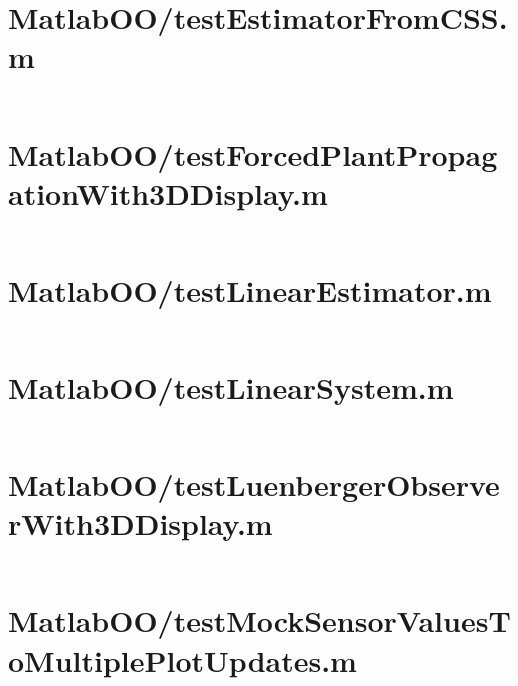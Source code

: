 \pagebreak
\section*{MatlabOO/testEstimatorFromCSS.m}\label{code:MatlabOO/testEstimatorFromCSS.m}
\inputminted[linenos,fontsize=\scriptsize]{matlab}{/home/dcouture/git/mathyourlife/TSatPy/beta_versions/matlab_object_oriented/testEstimatorFromCSS.m}

\pagebreak
\section*{MatlabOO/testForcedPlantPropagationWith3DDisplay.m}\label{code:MatlabOO/testForcedPlantPropagationWith3DDisplay.m}
\inputminted[linenos,fontsize=\scriptsize]{matlab}{/home/dcouture/git/mathyourlife/TSatPy/beta_versions/matlab_object_oriented/testForcedPlantPropagationWith3DDisplay.m}

\pagebreak
\section*{MatlabOO/testLinearEstimator.m}\label{code:MatlabOO/testLinearEstimator.m}
\inputminted[linenos,fontsize=\scriptsize]{matlab}{/home/dcouture/git/mathyourlife/TSatPy/beta_versions/matlab_object_oriented/testLinearEstimator.m}

\pagebreak
\section*{MatlabOO/testLinearSystem.m}\label{code:MatlabOO/testLinearSystem.m}
\inputminted[linenos,fontsize=\scriptsize]{matlab}{/home/dcouture/git/mathyourlife/TSatPy/beta_versions/matlab_object_oriented/testLinearSystem.m}

\pagebreak
\section*{MatlabOO/testLuenbergerObserverWith3DDisplay.m}\label{code:MatlabOO/testLuenbergerObserverWith3DDisplay.m}
\inputminted[linenos,fontsize=\scriptsize]{matlab}{/home/dcouture/git/mathyourlife/TSatPy/beta_versions/matlab_object_oriented/testLuenbergerObserverWith3DDisplay.m}

\pagebreak
\section*{MatlabOO/testMockSensorValuesToMultiplePlotUpdates.m}\label{code:MatlabOO/testMockSensorValuesToMultiplePlotUpdates.m}
\inputminted[linenos,fontsize=\scriptsize]{matlab}{/home/dcouture/git/mathyourlife/TSatPy/beta_versions/matlab_object_oriented/testMockSensorValuesToMultiplePlotUpdates.m}

